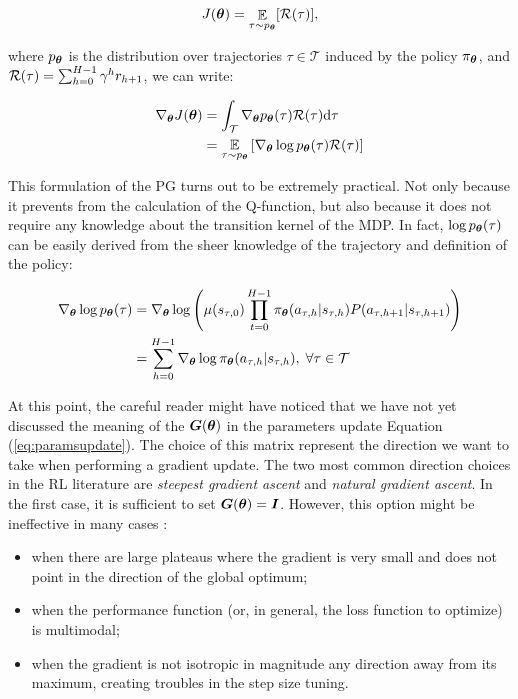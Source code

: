 \begin{align}
J(\boldsymbol{\theta}) = \mathop{\mathbb{E}}_{\tau\sim p_{\boldsymbol{\theta}}}[\mathcal{R}(\tau)], 
\end{align}

where $p_{\boldsymbol{\theta}}$ is the distribution over trajectories $\tau\in\mathcal{T}$ induced by the policy $\pi_{\boldsymbol{\theta}}$, and $\mathcal{R}(\tau) = \sum_{h=0}^{H-1}\gamma^{h}r_{h+1}$, we can write: 

\begin{align}
\nabla_{\boldsymbol{\theta}}J(\boldsymbol{\theta}) 
&= \int_{\mathcal{T}}\nabla_{\boldsymbol{\theta}}p_{\boldsymbol{\theta}}(\tau)\mathcal{R}(\tau)\mathrm{d}\tau \\
&= \underset{\tau\sim p_{\boldsymbol{\theta}}}{\mathbb{E}}\left[{\nabla_{\boldsymbol{\theta}}\log p_{\boldsymbol{\theta}}(\tau)\mathcal{R}(\tau)}\right] \label{eq:trajectoryPG}
\end{align}

This formulation of the \gls{PG} turns out to be extremely practical. Not only because it prevents from the calculation of the Q-function, but also because it does not require any knowledge about the transition kernel of the \gls{MDP}. In fact, $\log p_{\boldsymbol{\theta}}(\tau)$ can be easily derived from the sheer knowledge of the trajectory and definition of the policy:

\begin{align}
\nabla_{\boldsymbol{\theta}}\log p_{\boldsymbol{\theta}}(\tau) 
&= \nabla_{\boldsymbol{\theta}}\log\left( \mu(s_{\tau,0})\prod_{t=0}^{H-1}\pi_{\boldsymbol{\theta}}(a_{\tau,h}|s_{\tau,h})P(a_{\tau,h+1}|s_{\tau,h+1})\right) \\
&= \sum_{h=0}^{H-1}\nabla_{\boldsymbol{\theta}}\log\pi_{\boldsymbol{\theta}}(a_{\tau,h}|s_{\tau,h}), \; \forall \tau\in\mathcal{T} \label{eq:logpolicyestimate}
\end{align}

At this point, the careful reader might have noticed that we have not yet discussed the meaning of the $\boldsymbol{G}(\boldsymbol{\theta})$ in the parameters update Equation (\ref{eq:paramsupdate}). The choice of this matrix represent the direction we want to take when performing a gradient update. The two most common direction choices in the \gls{RL} literature are \emph{steepest gradient ascent} and \emph{natural gradient ascent}. In the first case, it is sufficient to set $\boldsymbol{G}(\boldsymbol{\theta})=\boldsymbol{I}$. However, this option might be ineffective in many cases \cite{amari1998natural1}:

\begin{itemize}
\item when there are large plateaus where the gradient is very small and does not point in the direction of the global optimum;
\item when the performance function (or, in general, the loss function to optimize) is multimodal;
\item when the gradient is not isotropic in magnitude \wrt any direction away from its maximum, creating troubles in the step size tuning.
\end{itemize}

